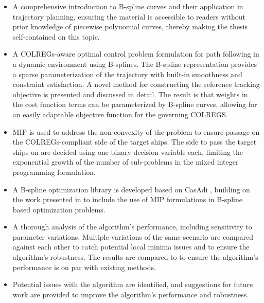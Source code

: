 \begin{itemize}
    \item A comprehensive introduction to B-spline curves and their application in trajectory planning, ensuring the material is accessible to readers without prior knowledge of piecewise polynomial curves, thereby making the thesis self-contained on this topic.
    \item A COLREGs-aware optimal control problem formulation for path following in a dynamic environment using B-splines. The B-spline representation provides a sparse parameterization of the trajectory with built-in smoothness and constraint satisfaction.
    A novel method for constructing the reference tracking objective is presented and discussed in detail. The result is that weights in the cost function terms can be parameterized by B-spline curves, allowing for an easily adaptable objective function for the governing COLREGS.
    \item \acrfull{MIP} is used to address the non-convexity of the problem to ensure passage on the COLREGs-compliant side of the target ships.
    The side to pass the target ships on are decided using one binary decision variable each, limiting the exponential growth of the number of sub-problems in the mixed integer programming formulation.
    \item A B-spline optimization library is developed based on CasAdi \citep{casadi}, building on the work presented in \citet{mercy2016spline} to include the use of \gls{MIP} formulations in B-spline based optimization problems.
    \item A thorough analysis of the algorithm's performance, including sensitivity to parameter variations. Multiple variations of the same scenario are compared against each other to catch potential local minima issues and to ensure the algorithm's robustness. The results are compared to \citet{Thyri2022-MPC} to ensure the algorithm's performance is on par with existing methods.
    \item Potential issues with the algorithm are identified, and suggestions for future work are provided to improve the algorithm's performance and robustness.
\end{itemize}


